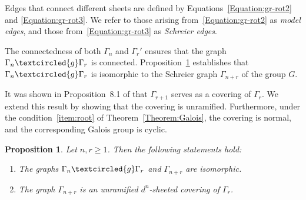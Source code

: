 \documentclass{article}
\newtheorem{mypro}{Proposition}[section]
\newcommand{\G}{\Gamma}
\newcommand{\g}{\textcircled{g}}
\begin{document}
Edges that connect different sheets are defined by Equations~\eqref{Equation:gr-rot2} and \eqref{Equation:gr-rot3}. We refer to those arising from~\eqref{Equation:gr-rot2} as \emph{model edges}, and those from~\eqref{Equation:gr-rot3} as \emph{Schreier edges}.

The connectedness of both $\G_n$ and $\G_r'$ ensures that the graph $\G_n \g \G_r$ is connected. Proposition~\ref{Proposition:coveringmap} establishes that $\G_n \g \G_r$ is isomorphic to the Schreier graph $\G_{n+r}$ of the group $G$.

It was shown in Proposition~8.1 of \cite{grigorchuk2002torsion} that $\G_{r+1}$ serves as a covering of $\G_r$. We extend this result by showing that the covering is unramified. Furthermore, under the condition~\eqref{item:root} of Theorem~\ref{Theorem:Galois}, the covering is normal, and the corresponding Galois group is cyclic.

\begin{mypro} \label{Proposition:coveringmap}
Let $n, r \geq 1$. Then the following statements hold:
\begin{enumerate}
    \item The graphs $\G_n \g \G_r$ and $\G_{n+r}$ are isomorphic.
    \item The graph $\G_{n+r}$ is an unramified $d^n$-sheeted covering of $\G_r$.
\end{enumerate}\end{mypro}
\end{document}

